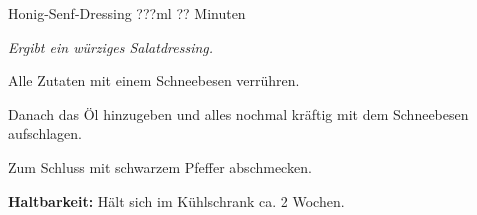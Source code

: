 \begin{recipe}{Honig-Senf-Dressing} {???ml} {?? Minuten}

\freeform
\textit{Ergibt ein würziges Salatdressing.}


Alle Zutaten mit einem Schneebesen verrühren.


Danach das Öl hinzugeben und alles nochmal kräftig mit dem Schneebesen aufschlagen.

Zum Schluss mit schwarzem Pfeffer abschmecken.

\freeform
\hrulefill

\freeform 
\textbf{Haltbarkeit:}
Hält sich im Kühlschrank ca. 2 Wochen.

\end{recipe}
